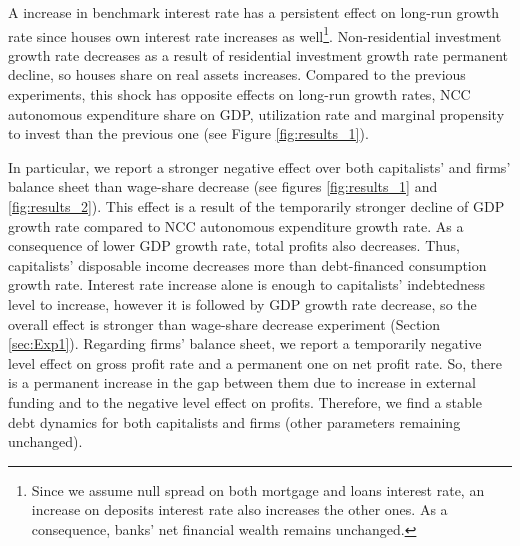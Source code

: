 \documentclass[12pt, a4]{article}
\begin{document}
A increase in benchmark interest rate  has a persistent effect on long-run growth rate since houses own interest rate increases as well\footnote{Since we assume null spread on both mortgage and loans interest rate, an increase on deposits interest rate also increases the other ones. As a consequence, banks' net financial wealth remains unchanged.}.
Non-residential investment growth rate decreases as a result of residential investment growth rate permanent decline, so houses share on real assets increases.
Compared to the previous experiments, this shock has opposite effects on long-run growth rates, NCC autonomous expenditure share on GDP, utilization rate and marginal propensity to invest  than the previous one (see Figure \ref{fig:results_1}).


In particular, we report a stronger negative effect over both capitalists' and firms' balance sheet than wage-share decrease (see figures \ref{fig:results_1} and \ref{fig:results_2}).
This effect is a result of the temporarily stronger decline of GDP growth rate compared to NCC autonomous expenditure growth rate.
As a consequence of lower GDP growth rate, total profits also decreases.
Thus, capitalists' disposable income decreases more than debt-financed consumption growth rate.
Interest rate increase alone is enough to capitalists' indebtedness level to increase, however it is followed by GDP growth rate decrease, so the overall effect is stronger than wage-share decrease experiment (Section \ref{sec:Exp1}).
Regarding firms' balance sheet, we report a temporarily negative level effect on gross profit rate and a permanent one on net profit rate. 
So, there is a permanent increase in the gap between them due to increase in external funding and to the negative level effect on profits.
Therefore, we find a stable debt dynamics for both capitalists and firms (other parameters remaining unchanged).
\end{document}
